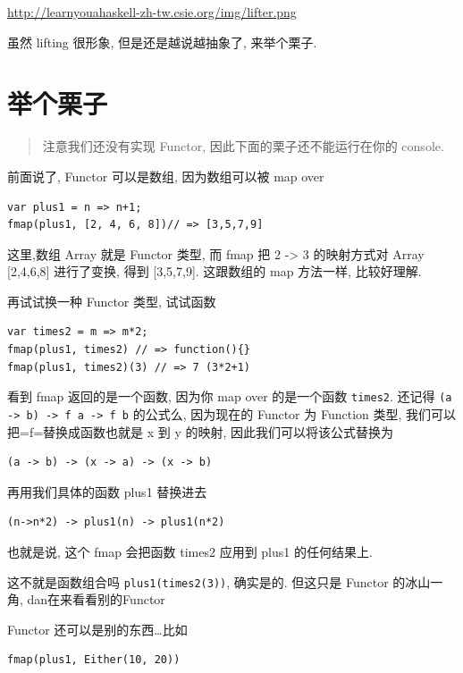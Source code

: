 \documentclass[a5paper]{book}
\begin{document}
\url{http://learnyouahaskell-zh-tw.csie.org/img/lifter.png}

虽然 lifting 很形象, 但是还是越说越抽象了, 来举个栗子. 
\chapter{举个栗子🌰}
\label{sec:orgheadline33}
\begin{quote}
注意我们还没有实现 Functor, 因此下面的栗子还不能运行在你的
console.
\end{quote}

前面说了, Functor 可以是数组, 因为数组可以被 map over

\begin{verbatim}
var plus1 = n => n+1;
fmap(plus1, [2, 4, 6, 8])// => [3,5,7,9]
\end{verbatim}

这里,数组 Array 就是 Functor 类型, 而 fmap 把 2 -> 3 的映射方式对 Array
[2,4,6,8] 进行了变换, 得到 [3,5,7,9]. 这跟数组的 map 方法一样,
比较好理解.

再试试换一种 Functor 类型, 试试函数

\begin{verbatim}
var times2 = m => m*2;
fmap(plus1, times2) // => function(){}
fmap(plus1, times2)(3) // => 7 (3*2+1)
\end{verbatim}

看到 fmap 返回的是一个函数, 因为你 map over 的是一个函数 \texttt{times2}. 还记得
\texttt{(a -> b) -> f a -> f b} 的公式么, 因为现在的 Functor 为 Function 类型,
我们可以把=f=替换成函数也就是 x 到 y 的映射, 因此我们可以将该公式替换为

\begin{verbatim}
(a -> b) -> (x -> a) -> (x -> b)
\end{verbatim}

再用我们具体的函数 plus1 替换进去

\begin{verbatim}
(n->n*2) -> plus1(n) -> plus1(n*2)
\end{verbatim}

也就是说, 这个 fmap 会把函数 times2 应用到 plus1 的任何结果上.

这不就是函数组合吗 \texttt{plus1(times2(3))}, 确实是的. 但这只是 Functor
的冰山一角, dan在来看看别的Functor

Functor 还可以是别的东西\ldots{}比如

\begin{verbatim}
fmap(plus1, Either(10, 20))
\end{verbatim}
\end{document}
